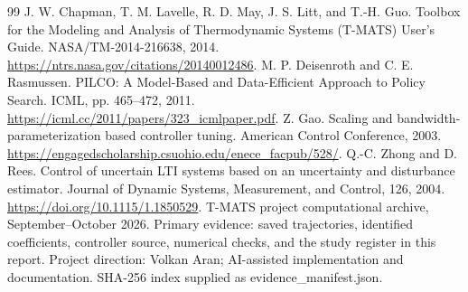 \begin{thebibliography}{99}
 J. W. Chapman, T. M. Lavelle, R. D. May, J. S. Litt, and T.-H. Guo. Toolbox for the Modeling and Analysis of Thermodynamic Systems (T-MATS) User's Guide. NASA/TM-2014-216638, 2014. \url{https://ntrs.nasa.gov/citations/20140012486}.
 M. P. Deisenroth and C. E. Rasmussen. PILCO: A Model-Based and Data-Efficient Approach to Policy Search. ICML, pp. 465--472, 2011. \url{https://icml.cc/2011/papers/323_icmlpaper.pdf}.
 Z. Gao. Scaling and bandwidth-parameterization based controller tuning. American Control Conference, 2003. \url{https://engagedscholarship.csuohio.edu/enece_facpub/528/}.
 Q.-C. Zhong and D. Rees. Control of uncertain LTI systems based on an uncertainty and disturbance estimator. Journal of Dynamic Systems, Measurement, and Control, 126, 2004. \url{https://doi.org/10.1115/1.1850529}.
 T-MATS project computational archive, September--October 2026. Primary evidence: saved trajectories, identified coefficients, controller source, numerical checks, and the study register in this report. Project direction: Volkan Aran; AI-assisted implementation and documentation. SHA-256 index supplied as evidence\_manifest.json.
\end{thebibliography}
